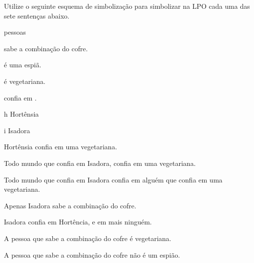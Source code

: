 \problempart
Utilize o seguinte esquema de simbolização para simbolizar na LPO cada uma das sete sentenças abaixo.
\begin{center}
\begin{ekey}
\item[\text{domínio}] pessoas
\item[\atom{S}{x}]  sabe a combinação do cofre.
\item[\atom{E}{x}]  é uma espiã.
\item[\atom{V}{x}]  é vegetariana.
\item[\atom{C}{x,y}]  confia em .
\item[h] Hortênsia
\item[i] Isadora
\end{ekey}
\end{center}
\begin{earg}
\item Hortênsia confia em uma vegetariana.
\item Todo mundo que confia em Isadora, confia em uma vegetariana.
\item Todo mundo que confia em Isadora confia em alguém que confia em uma vegetariana.
\item Apenas Isadora sabe a combinação do cofre.
\item Isadora confia em Hortência, e em mais ninguém.
\item A pessoa que sabe a combinação do cofre é vegetariana.
\item A pessoa que sabe a combinação do cofre não é um espião.
\end{earg}


